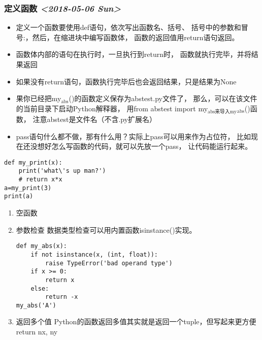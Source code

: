 \documentclass[11pt]{article}
\begin{document}
\subsubsection{定义函数 \textit{<2018-05-06 Sun>}}
\label{sec:org6a59ec4}
\begin{itemize}
\item 定义一个函数要使用def语句，依次写出函数名、括号、
括号中的参数和冒号:，然后，在缩进块中编写函数体，
函数的返回值用return语句返回。
\item 函数体内部的语句在执行时，一旦执行到return时，
函数就执行完毕，并将结果返回
\item 如果没有return语句，函数执行完毕后也会返回结果，只是结果为None
\item 果你已经把my\(_{\text{abs}}\)()的函数定义保存为abstest.py文件了，
那么，可以在该文件的当前目录下启动Python解释器，
用from abstest import my\(_{\text{abs来导入my}}\)\(_{\text{abs}}\)()函数，
注意abstest是文件名（不含.py扩展名）
\item pass语句什么都不做，那有什么用？实际上pass可以用来作为占位符，
比如现在还没想好怎么写函数的代码，就可以先放一个pass，
让代码能运行起来。
\end{itemize}
\begin{verbatim}
def my_print(x):
    print('what\'s up man?')
    # return x*x
a=my_print(3)
print(a)
\end{verbatim}
\begin{enumerate}
\item 空函数
\label{sec:org1ba106f}
\item 参数检查
\label{sec:orgaa9edff}
数据类型检查可以用内置函数isinstance()实现。
\begin{verbatim}
def my_abs(x):
    if not isinstance(x, (int, float)):
        raise TypeError('bad operand type')
    if x >= 0:
        return x
    else:
        return -x
my_abs('A')
\end{verbatim}
\item 返回多个值
\label{sec:org87da2d0}
Python的函数返回多值其实就是返回一个tuple，但写起来更方便
return nx, ny
\end{enumerate}
\end{document}
